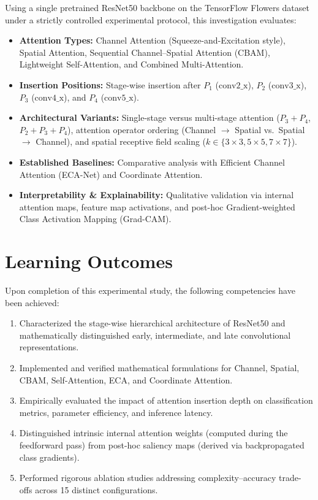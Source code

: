 \documentclass[11pt,a4paper]{article}
\begin{document}
Using a single pretrained ResNet50 backbone on the TensorFlow Flowers dataset under a strictly controlled experimental protocol, this investigation evaluates:
\begin{itemize}[noitemsep,topsep=0pt]
    \item \textbf{Attention Types:} Channel Attention (Squeeze-and-Excitation style), Spatial Attention, Sequential Channel--Spatial Attention (CBAM), Lightweight Self-Attention, and Combined Multi-Attention.
    \item \textbf{Insertion Positions:} Stage-wise insertion after $P_1$ ($\text{conv2\_x}$), $P_2$ ($\text{conv3\_x}$), $P_3$ ($\text{conv4\_x}$), and $P_4$ ($\text{conv5\_x}$).
    \item \textbf{Architectural Variants:} Single-stage versus multi-stage attention ($P_3 + P_4$, $P_2 + P_3 + P_4$), attention operator ordering (Channel $\to$ Spatial vs.\ Spatial $\to$ Channel), and spatial receptive field scaling ($k \in \{3\times3, 5\times5, 7\times7\}$).
    \item \textbf{Established Baselines:} Comparative analysis with Efficient Channel Attention (ECA-Net) and Coordinate Attention.
    \item \textbf{Interpretability \& Explainability:} Qualitative validation via internal attention maps, feature map activations, and post-hoc Gradient-weighted Class Activation Mapping (Grad-CAM).
\end{itemize}

\section{Learning Outcomes}
Upon completion of this experimental study, the following competencies have been achieved:
\begin{enumerate}[noitemsep,topsep=0pt]
    \item Characterized the stage-wise hierarchical architecture of ResNet50 and mathematically distinguished early, intermediate, and late convolutional representations.
    \item Implemented and verified mathematical formulations for Channel, Spatial, CBAM, Self-Attention, ECA, and Coordinate Attention.
    \item Empirically evaluated the impact of attention insertion depth on classification metrics, parameter efficiency, and inference latency.
    \item Distinguished intrinsic internal attention weights (computed during the feedforward pass) from post-hoc saliency maps (derived via backpropagated class gradients).
    \item Performed rigorous ablation studies addressing complexity--accuracy trade-offs across 15 distinct configurations.
\end{enumerate}
\end{document}
